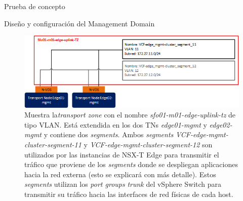 \begin{section}{Prueba de concepto}
\begin{subsection}{Diseño y configuración del Management Domain}
    \begin{figure}[h]
      \centering
      \includegraphics[width=1\textwidth]{imaxes/pruebaconcepto/VLANTZSegments.png}
       \caption{Muestra la\textit{transport zone} con el nombre \textit{sfo01-m01-edge-uplink-tz} de tipo VLAN. Está extendida en los dos TNs \textit{edge01-mgmt} y \textit{edge02-mgmt} y contiene dos \textit{segments}. Ambos \textit{segments} \textit{VCF-edge-mgmt-cluster-segment-11} y \textit{VCF-edge-mgmt-cluster-segment-12} son utilizados por las instancias de NSX-T Edge para transmitir el tráfico que proviene de los \textit{segments} donde se despliegan aplicaciones hacia la red externa (esto se explicará con más detalle). Estos \textit{segments} utilizan los \textit{port groups} \textit{trunk} del vSphere Switch para transmitir su tráfico hacia las interfaces de red físicas de cada host.}
      \label{fig:VLAN-TZ-segments-NSXT}
    \end{figure}


\end{subsection}
\end{section}

